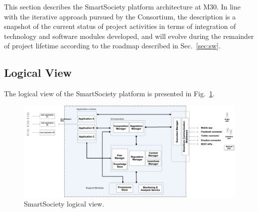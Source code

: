 This section describes the SmartSociety platform architecture at M30. In line with the iterative approach pursued by the Consortium, the description is a snapshot of the current status of project activities in terms of integration of technology and software modules developed, and will evolve during the remainder of project lifetime according to the roadmap described in Sec.~\ref{sec:sw}.


\subsection{Logical View}
The logical view of the SmartSociety platform is presented in Fig.~\ref{fig:logical_view}. %

\begin{figure}
 \centering
 \includegraphics[width=1\textwidth]{figs/functional_diagram}%
 \caption{SmartSociety logical view.}
 \label{fig:logical_view}
\end{figure}

